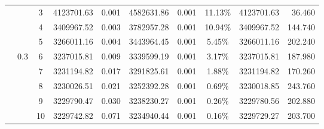 {\begin{longtable}{cccrcrrcrr}
			&       & 3     & 4123701.63 & 0.001 & 4582631.86 & 0.001 & 11.13\% & 4123701.63 & 36.460 \\
			&       & 4     & 3409967.52 & 0.003 & 3782957.28 & 0.001 & 10.94\% & 3409967.52 & 144.740 \\
			&       & 5     & 3266011.16 & 0.004 & 3443964.45 & 0.001 & 5.45\% & 3266011.16 & 202.240 \\
			& 0.3   & 6     & 3237015.81 & 0.009 & 3339599.19 & 0.001 & 3.17\% & 3237015.81 & 187.980 \\
			&       & 7     & 3231194.82 & 0.017 & 3291825.61 & 0.001 & 1.88\% & 3231194.82 & 170.260 \\
			&       & 8     & 3230026.51 & 0.021 & 3252392.28 & 0.001 & 0.69\% & 3230018.85 & 243.760 \\
			&       & 9     & 3229790.47 & 0.030 & 3238230.27 & 0.001 & 0.26\% & 3229780.56 & 202.880 \\
			&       & 10    & 3229742.82 & 0.071 & 3234940.44 & 0.001 & 0.16\% & 3229729.27 & 203.700 \\
	\bottomrule %
\end{longtable}
}
